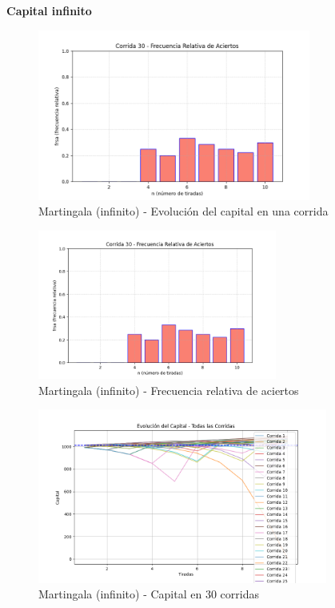 \documentclass{article}
\begin{document}
\textbf{Capital infinito}

\begin{figure}
    \centering
    \includegraphics[width=0.8\textwidth]{./images/frsa_corrida_30_m_i.png}
    \caption{Martingala (infinito) - Evolución del capital en una corrida}
\end{figure}

\begin{figure}
    \centering
    \includegraphics[width=0.7\textwidth]{./images/frsa_corrida_30_m_i.png}
    \caption{Martingala (infinito) - Frecuencia relativa de aciertos}
\end{figure}

\begin{figure}
    \centering
    \includegraphics[width=0.85\textwidth]{./images/capital_todas_corridas_m_i.png}
    \caption{Martingala (infinito) - Capital en 30 corridas}
\end{figure}
\end{document}
